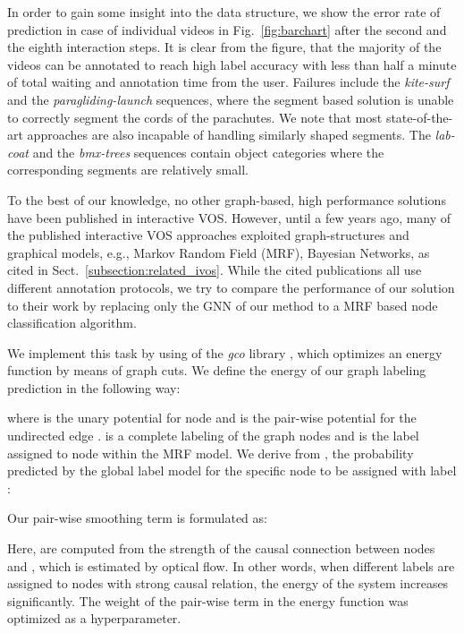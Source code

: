 \documentclass[conference]{IEEEtran}
\begin{document}
In order to gain some insight into the data structure, we show the error rate of prediction in case of individual videos in Fig.~\ref{fig:barchart} after the second and the eighth interaction steps. It is clear from the figure, that the majority of the videos can be annotated to reach high label accuracy with less than half a minute of total waiting and annotation time from the user. Failures include the \textit{kite-surf} and the \textit{paragliding-launch} sequences, where the segment based solution is unable to correctly segment the cords of the parachutes. We note that most state-of-the-art approaches are also incapable of handling similarly shaped segments. The \textit{lab-coat} and the \textit{bmx-trees} sequences contain object categories where the corresponding segments are relatively small.

To the best of our knowledge, no other graph-based, high performance solutions have been published in interactive VOS. However, until a few years ago, many of the published interactive VOS approaches exploited graph-structures and graphical models, e.g., Markov Random Field (MRF), Bayesian Networks, as cited in Sect.~\ref{subsection:related_ivos}. While the cited publications all use different annotation protocols, we try to compare the performance of our solution to their work by replacing only the GNN of our method to a MRF based node classification algorithm. 

We implement this task by using of the \textit{gco} library \cite{mrf1, mrf2, mrf3}, which optimizes an energy function by means of graph cuts. We define the energy of our graph labeling prediction in the following way:



\noindent where  is the unary potential for node  and  is the pair-wise potential for the undirected edge .  is a complete labeling of the graph nodes and  is the label assigned to node  within the MRF model. We derive  from , the probability predicted by the global label model for the specific node to be assigned with label :



Our pair-wise smoothing term is formulated as:



Here,  are computed from the strength of the causal connection between nodes  and , which is estimated by optical flow. In other words, when different labels are assigned to nodes with strong causal relation, the energy of the system increases significantly. The weight of the pair-wise term in the energy function was optimized as a hyperparameter.
\end{document}
